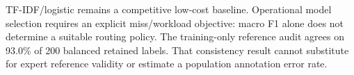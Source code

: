 TF-IDF/logistic remains a competitive low-cost baseline. Operational model selection requires an explicit miss/workload objective: macro F1 alone does not determine a suitable routing policy. The training-only reference audit agrees on 93.0\% of 200 balanced retained labels. That consistency result cannot substitute for expert reference validity or estimate a population annotation error rate.
